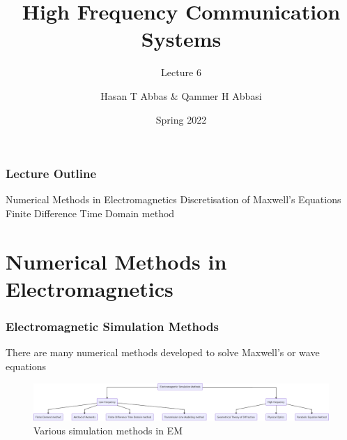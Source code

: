 \documentclass[10pt]{beamer}
\title{High Frequency Communication Systems}
\subtitle{Lecture 6}
\date{Spring 2022}
\author{Hasan T Abbas \& Qammer H Abbasi}
\begin{document}
\maketitle

\begin{frame}[fragile]
    \frametitle{Lecture Outline}
    \begin{outline}[itemize]
        \1 Numerical Methods in Electromagnetics
        \1 Discretisation of Maxwell's Equations
        \1 Finite Difference Time Domain method
    \end{outline}
\end{frame}

\section{Numerical Methods in Electromagnetics}




\begin{frame}
    \frametitle{Electromagnetic Simulation Methods}
    \begin{outline}
        \1 There are many numerical methods developed to solve Maxwell's or wave equations
    \end{outline}
    \begin{figure}[h!]
        \centering
        \includegraphics[width=1.0\textwidth]{em methods_1.pdf}
        \caption{Various simulation methods in EM}
    \end{figure}
\end{frame}
\end{document}
